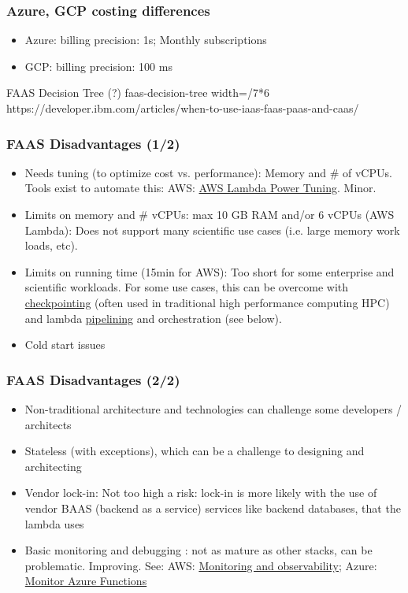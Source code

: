 \documentclass[11pt,aspectratio=169]{beamer}
\begin{document}
\begin{nrcanFrame}
  \frametitle{Azure, GCP costing differences}
  \begin{itemize}
  \item Azure: billing precision: 1s; Monthly subscriptions
  \item GCP: billing precision: 100 ms
    \end{itemize}
  \end{nrcanFrame}

\nrcanGraphicFrame
  {FAAS Decision Tree (?)}
  {faas-decision-tree}
  {width=\paperwidth/7*6}
  {https://developer.ibm.com/articles/when-to-use-iaas-faas-paas-and-caas/}


\begin{nrcanFrame}
  \frametitle{FAAS Disadvantages (1/2)}
    \begin{itemize}
    \item Needs tuning (to optimize cost vs. performance): Memory and \# of vCPUs.
      Tools exist to automate this: AWS:
      \href{https://docs.aws.amazon.com/lambda/latest/operatorguide/profile-functions.html}
           {AWS Lambda Power Tuning}. \alert{Minor}.
  \item Limits on memory and \# vCPUs: max 10 GB RAM and/or 6 vCPUs (AWS
    Lambda): Does not support many scientific use cases (i.e. large
    memory work loads, etc).
  \item Limits on running time (15min for AWS): Too short for some enterprise and scientific workloads.
    For some use cases, this can be overcome with \href{https://en.wikipedia.org/wiki/Application\_checkpointing}{checkpointing} (often used in traditional high performance computing HPC) and lambda \href{https://en.wikipedia.org/wiki/Pipeline\_(software)}{pipelining} and orchestration (see below).
  \item Cold start issues
    \end{itemize}
\end{nrcanFrame}

\begin{nrcanFrame}
  \frametitle{FAAS Disadvantages (2/2)}
    \begin{itemize}
  \item Non-traditional architecture and technologies can challenge
    some developers / architects
  \item Stateless (with exceptions), which can be a challenge to designing and architecting
  \item Vendor lock-in: Not too high a risk: lock-in is more likely
    with the use of vendor BAAS (backend as a service) services like
    backend databases, that the lambda uses
  \item Basic monitoring and debugging : not as mature as other stacks,
    can be problematic.
    Improving. See: AWS: \href{https://docs.aws.amazon.com/lambda/latest/operatorguide/monitoring-observability.html}{Monitoring and observability}; Azure: \href{https://docs.microsoft.com/en-us/azure/azure-functions/functions-monitoring}{Monitor Azure Functions}
    \end{itemize}
\end{nrcanFrame}
\end{document}
